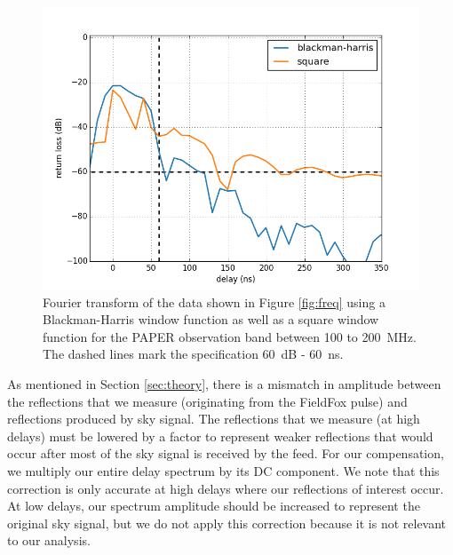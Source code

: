 \documentclass[12pt,preprint]{aastex}
\begin{document}
\begin{figure}[H]
\centering
\includegraphics[totalheight=0.4\textheight]{plots/bh_vs_sq.png}
\caption{Fourier transform of the data shown in Figure \ref{fig:freq} using a Blackman-Harris window function as well as a square window function for the PAPER observation band between 100 to 200~MHz. The dashed lines mark the specification 60~dB - 60~ns.   }
\label{fig:window}
\end{figure}

As mentioned in Section \ref{sec:theory}, there is a mismatch in amplitude between the reflections that we measure (originating from the FieldFox pulse) and reflections produced by sky signal. The reflections that we measure (at high delays) must be lowered by a factor to represent weaker reflections that would occur after most of the sky signal is received by the feed. For our compensation, we multiply our entire delay spectrum by its DC component. We note that this correction is only accurate at high delays where our reflections of interest occur. At low delays, our spectrum amplitude should be increased to represent the original sky signal, but we do not apply this correction because it is not relevant to our analysis.
\end{document}
